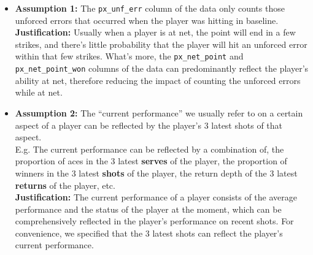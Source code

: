 \begin{itemize}
    \item \textbf{Assumption 1:} The \verb|px_unf_err| column of the data only counts those unforced errors that occurred when the player was hitting in baseline.\\
    \textbf{Justification:} Usually when a player is at net, the point will end in a few strikes, and there's little probability that the player will hit an unforced error within that few strikes. What's more, the \verb|px_net_point| and \verb|px_net_point_won| columns of the data can predominantly reflect the player's ability at net, therefore reducing the impact of counting the unforced errors while at net.
    
    \item \textbf{Assumption 2:} The ``current performance'' we usually refer to on a certain aspect of a player can be reflected by the player's 3 latest shots of that aspect.\\
    E.g. The current performance can be reflected by a combination of, the proportion of aces in the 3 latest \textbf{serves} of the player, the proportion of winners in the 3 latest \textbf{shots} of the player, the return depth of the 3 latest \textbf{returns} of the player, etc. \\
    \textbf{Justification:} The current performance of a player consists of the average performance and the status of the player at the moment, which can be comprehensively reflected in the player's performance on recent shots. For convenience, we specified that the 3 latest shots can reflect the player's current performance.
\end{itemize}